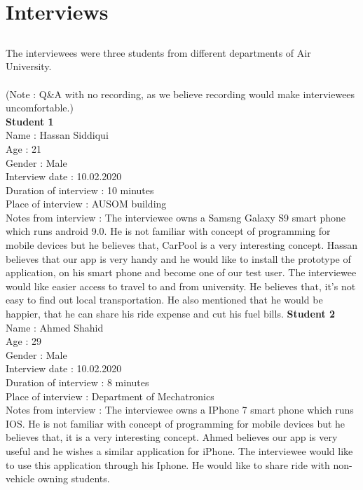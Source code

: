 \chapter{Interviews} \label{ap:Appendix1}


\section*{}
The interviewees were three students from different departments of Air University.\\~\\
(Note : Q&A with no recording, as we believe recording would make interviewees uncomfortable.)\\
\large {\textbf{Student 1 }}
\\ Name : Hassan Siddiqui 
\\ Age : 21 
\\ Gender : Male
\\ Interview date : 10.02.2020 
\\ Duration of interview : 10 minutes 
\\ Place of interview : AUSOM building 
\\ Notes from interview : The interviewee owns a Samsng Galaxy S9 smart phone which runs android 9.0. He is not familiar with concept of programming for mobile devices but he believes that, CarPool is a very interesting concept. Hassan believes that our app is very handy and he would like to install the prototype of application, on his smart phone and become one of our test user. The interviewee would like easier access to travel to and from university. He believes that, it's not easy to find out local transportation. He also mentioned that he would be happier, that he can share his ride expense and cut his fuel bills.\newpage
\large {\textbf{Student 2 }}
\\ Name : Ahmed Shahid
\\ Age : 29 
\\ Gender : Male
\\ Interview date : 10.02.2020 
\\ Duration of interview : 8 minutes 
\\ Place of interview : Department of Mechatronics
\\ Notes from interview : The interviewee owns a IPhone 7 smart phone which runs IOS. He is not familiar with concept of programming for mobile devices but he believes that, it is a very interesting concept. Ahmed believes our app is very useful and he wishes a similar application for iPhone. The interviewee would like to use this application through his Iphone. He would like to share ride with non-vehicle owning students.\\~\\

